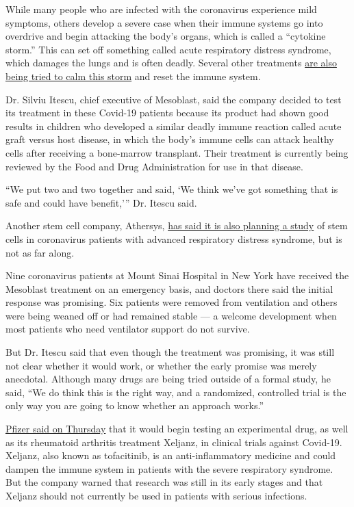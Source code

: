 While many people who are infected with the coronavirus experience mild
symptoms, others develop a severe case when their immune systems go into
overdrive and begin attacking the body's organs, which is called a
``cytokine storm.'' This can set off something called acute respiratory
distress syndrome, which damages the lungs and is often deadly. Several
other treatments
\href{https://www.nytimes3xbfgragh.onion/2020/04/01/health/coronavirus-cytokine-storm-immune-system.html}{are
also being tried to calm this storm} and reset the immune system.

Dr. Silviu Itescu, chief executive of Mesoblast, said the company
decided to test its treatment in these Covid-19 patients because its
product had shown good results in children who developed a similar
deadly immune reaction called acute graft versus host disease, in which
the body's immune cells can attack healthy cells after receiving a
bone-marrow transplant. Their treatment is currently being reviewed by
the Food and Drug Administration for use in that disease.

``We put two and two together and said, `We think we've got something
that is safe and could have benefit,''' Dr. Itescu said.

Another stem cell company, Athersys,
\href{https://www.athersys.com/clinical-trials/ards/}{has said it is
also planning a study} of stem cells in coronavirus patients with
advanced respiratory distress syndrome, but is not as far along.

Nine coronavirus patients at Mount Sinai Hospital in New York have
received the Mesoblast treatment on an emergency basis, and doctors
there said the initial response was promising. Six patients were removed
from ventilation and others were being weaned off or had remained stable
--- a welcome development when most patients who need ventilator support
do not survive.

But Dr. Itescu said that even though the treatment was promising, it was
still not clear whether it would work, or whether the early promise was
merely anecdotal. Although many drugs are being tried outside of a
formal study, he said, ``We do think this is the right way, and a
randomized, controlled trial is the only way you are going to know
whether an approach works.''

\href{https://www.pfizer.com/news/press-release/press-release-detail/pfizer_advances_battle_against_covid_19_on_multiple_fronts}{Pfizer
said on Thursday} that it would begin testing an experimental drug, as
well as its rheumatoid arthritis treatment Xeljanz, in clinical trials
against Covid-19. Xeljanz, also known as tofacitinib, is an
anti-inflammatory medicine and could dampen the immune system in
patients with the severe respiratory syndrome. But the company warned
that research was still in its early stages and that Xeljanz should not
currently be used in patients with serious infections.

